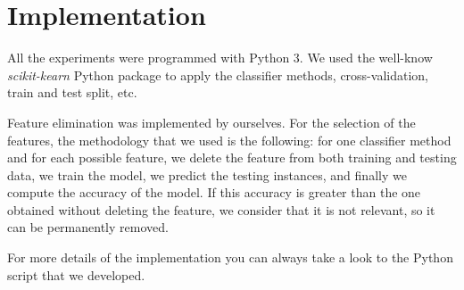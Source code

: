 \section{Implementation}
\label{sec:implementation}

All the experiments were programmed with Python 3. We used the well-know \textit{scikit-kearn} Python package to apply the classifier methods, cross-validation, train and test split, etc. 

Feature elimination was implemented by ourselves. For the selection of the features, the methodology that we used is the following: for one classifier method and for each possible feature, we delete the feature from both training and testing data, we train the model, we predict the testing instances, and finally we compute the accuracy of the model. If this accuracy is greater than the one obtained without deleting the feature, we consider that it is not relevant, so it can be permanently removed.

For more details of the implementation you can always take a look to the Python script that we developed.